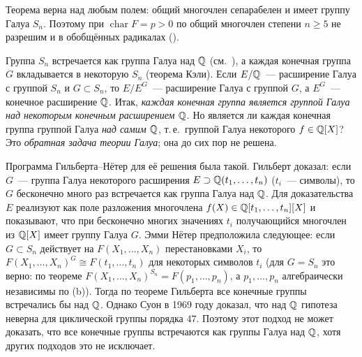 Теорема  верна над любым полем: общий многочлен сепарабелен и имеет группу Галуа $S_n$. Поэтому при
$\operatorname{char}F=p>0$ по  общий многочлен степени $n\ge5$ не разрешим и в обобщённых радикалах ().

\begin{aside}
Группа $S_n$ встречается как группа Галуа над $\mathbb Q$ (см.\ ), а каждая конечная группа $G$ вкладывается в
некоторую $S_n$ (теорема Кэли). Если $E/\mathbb Q$~--- расширение Галуа с группой $S_n$ и $G\subset S_n$, то $E/E^G$~---
расширение Галуа с группой $G$, а $E^G$~--- конечное расширение $\mathbb Q$. Итак, \emph{каждая конечная группа является группой
Галуа над некоторым конечным расширением $\mathbb Q$}. Но является ли каждая конечная группа группой Галуа \emph{над самим
$\mathbb Q$}, т.\,е.\ группой Галуа некоторого $f\in\mathbb Q[X]$? Это \emph{обратная задача теории Галуа}; она до сих пор не решена.

Программа Гильберта--Нётер для её решения была такой. Гильберт доказал: если $G$~--- группа Галуа некоторого расширения
$E\supset\mathbb Q(t_1,\dots,t_n)$ ($t_i$~--- символы), то $G$ бесконечно много раз встречается как группа Галуа над $\mathbb Q$. Для
доказательства $E$ реализуют как поле разложения многочлена $f(X)\in\mathbb Q[t_1,\dots,t_n][X]$ и показывают, что при
бесконечно многих значениях $t_i$ получающийся многочлен из $\mathbb Q[X]$ имеет группу Галуа $G$. Эмми Нётер предположила
следующее: если $G\subset S_n$ действует на $F(X_1,\dots,X_n)$ перестановками $X_i$, то
$F(X_1,\dots,X_n)^G\cong F(t_1,\dots,t_n)$ для некоторых символов $t_i$ (для $G=S_n$ это верно: по теореме 
$F(X_1,\dots,X_n)^{S_n}=F(p_1,\dots,p_n)$, а $p_1,\dots,p_n$ алгебраически независимы по (b)). Тогда по
теореме Гильберта все конечные группы встречались бы над $\mathbb Q$. Однако Суон в 1969 году доказал, что над $\mathbb Q$ гипотеза
неверна для циклической группы порядка $47$. Поэтому этот подход не может доказать, что все конечные группы встречаются
как группы Галуа над $\mathbb Q$, хотя других подходов это не исключает.
\end{aside}

